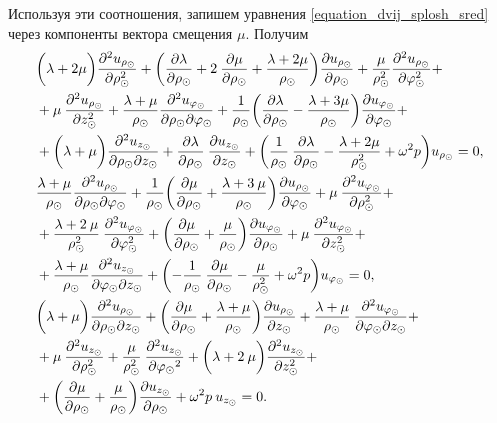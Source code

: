 Используя эти соотношения, запишем уравнения \eqref{equation_dvij_splosh_sred} через компоненты вектора смещения $\mu.$ Получим
\begin{equation}\label{equation_otn_u}
\begin{aligned}
&\biggl(\lambda+2\mu\biggr)\frac{\partial^2u_{\rho_\odot}}{\partial \rho^2_\odot}+\biggl(\frac{\partial\lambda}{\partial \rho_\odot}+2\:\frac{\partial\mu}{\partial \rho_\odot}+\frac{\lambda+2\mu}{\rho_\odot}\biggr)\frac{\partial u_{\rho_\odot}}{\partial \rho_\odot}+\frac{\mu}{\rho^2_\odot}\frac{\partial^2 u_{\rho_\odot}}{\partial \varphi^2_\odot}+\\
&+\mu\:\frac{\partial^2 u_{\rho_\odot}}{\partial z^2_\odot}+\frac{\lambda+\mu}{\rho_\odot}\frac{\partial^2 u_{\varphi_\odot}}{\partial \rho_\odot\partial\varphi_\odot}+\frac{1}{\rho_\odot}\biggl(\frac{\partial\lambda}{\partial \rho_\odot}-\frac{\lambda+3\mu}{\rho_\odot}\biggr)\frac{\partial u_{\varphi_\odot}}{\partial\varphi_\odot}+\\
&+\biggl(\lambda+\mu\biggr)\frac{\partial^2 u_{z_\odot}}{\partial \rho_\odot\partial z_\odot}+\frac{\partial\lambda}{\partial \rho_\odot}\:\frac{\partial u_{z_\odot}}{\partial z_\odot}+\biggl(\frac{1}{\rho_\odot}\:\frac{\partial\lambda}{\partial \rho_\odot}-\frac{\lambda+2\mu}{\rho^2_\odot}+\omega^2 p\biggr)u_{\rho_\odot}=0,\\
&\frac{\lambda+\mu}{\rho_\odot}\frac{\partial^2u_{\rho_\odot}}{\partial \rho_\odot\partial\varphi_\odot}+\frac{1}{\rho_\odot}\biggl(\frac{\partial\mu}{\partial \rho_\odot}+\frac{\lambda+3\:\mu}{\rho_\odot}\biggr)\frac{\partial u_{\rho_\odot}}{\partial\varphi_\odot}+\mu\:\frac{\partial^2 u_{\varphi_\odot}}{\partial \rho^2_\odot}+\\
&+\frac{\lambda+2\:\mu}{\rho^2_\odot}\:\frac{\partial^2 u_{\varphi_\odot}}{\partial \varphi^2_\odot}+\biggl(\frac{\partial\mu}{\partial \rho_\odot}+\frac{\mu}{\rho_\odot}\biggr)\frac{\partial u_{\varphi_\odot}}{\partial \rho_\odot}+\mu\:\frac{\partial^2 u_{\varphi_\odot}}{\partial z^2_\odot}+\\
&+\frac{\lambda+\mu}{\rho_\odot}\frac{\partial^2 u_{z_\odot}}{\partial \varphi_\odot\partial z_\odot}+\biggl(-\frac{1}{\rho_\odot}\:\frac{\partial\mu}{\partial \rho_\odot}-\frac{\mu}{\rho^2_\odot}+\omega^2 p\biggr)u_{\varphi_\odot}=0,\\
&\biggl(\lambda+\mu\biggr)\frac{\partial^2u_{\rho_\odot}}{\partial \rho_\odot\partial z_\odot}+\biggl(\frac{\partial\mu}{\partial \rho_\odot}+\frac{\lambda+\mu}{\rho_\odot}\biggr)\frac{\partial u_{\rho_\odot}}{\partial z_\odot}+\frac{\lambda+\mu}{\rho_\odot}\:\frac{\partial^2 u_{\varphi_\odot}}{\partial \varphi_\odot\partial z_\odot}+\\
&+\mu\:\frac{\partial^2 u_{z_\odot}}{\partial \rho^2_\odot}+\frac{\mu}{\rho^2_\odot}\:\frac{\partial^2 u_{z_\odot}}{\partial {\varphi_\odot}^2}+\biggl(\lambda+2\:\mu\biggr)\frac{\partial^2 u_{z_\odot}}{\partial z^2_\odot}+\\
&+\biggl(\frac{\partial\mu}{\partial \rho_\odot}+\frac{\mu}{\rho_\odot}\biggr)\frac{\partial u_{z_\odot}}{\partial \rho_\odot}+\omega^2 p\:u_{z_\odot}=0.
\end{aligned}
\end{equation}


